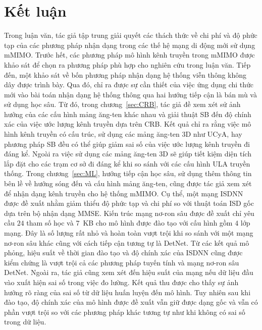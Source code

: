 \clearpage
{}

\chapter*{Kết luận}

Trong luận văn, tác giả tập trung giải quyết các thách thức về chi phí và độ phức tạp của các phương pháp nhận dạng trong các thế hệ mạng di động mới sử dụng mMIMO. Trước hết, các phương pháp mô hình kênh truyền trong mMIMO được khảo sát để chọn ra phương pháp phù hợp cho nghiên cứu trong luận văn. Tiếp đến,
một khảo sát về bốn phương pháp nhận dạng hệ thống viễn thông không dây được trình bày. Qua đó, chỉ ra được sự cần thiết của việc ứng dụng chi thức mới vào bài toán nhận dạng hệ thống thông qua hai hướng tiếp cận là bán mù và sử dụng học sâu. 
Từ đó, trong chương~\ref{sec:CRB}, tác giả đề xem xét sử ảnh hưởng của các cấu hình mảng ăng-ten khác nhau và giải thuật SB đến độ chính xác của việc ước lượng kênh truyền dựa trên CRB. Kết quả chỉ ra rằng việc mô hình kênh truyền có cấu trúc, sử dụng các mảng ăng-ten 3D như UCyA, hay phương pháp SB đều có thể giúp giảm sai số của việc ước lượng kênh truyền đi đáng kể. Ngoài ra việc sử dụng các mảng ăng-ten 3D sẽ giúp tiết kiệm diện tích lắp đặt cho các trạm cơ sở đi đáng kể khi so sánh với các cấu hình ULA truyền thống.
Trong chương~\ref{sec:ML}, hướng tiếp cận học sâu, sử dụng thêm thông tin bên lề về hướng sóng đến và cấu hình mảng ăng-ten, cũng được tác giả xem xét để nhận dạng kênh truyền cho hệ thống mMIMO. Cụ thể, một mạng ISDNN được đề xuất nhằm giảm thiểu độ phức tạp và chi phí so với thuật toán ISD gốc dựa trên bộ nhận dạng MMSE. Kiến trúc mạng nơ-ron sâu được đề xuất chỉ yêu cầu $24$ tham số học và $7$~KB cho mô hình được đào tạo với cấu hình gồm $4$ lớp mạng. Đây là số lượng rất nhỏ và hoàn toàn vượt trội khi so sánh với một mạng nơ-ron sâu khác cũng với cách tiếp cận tương tự là DetNet. Từ các kết quả mô phỏng, hiệu suất về thời gian đào tạo và độ chính xác của ISDNN cũng được kiểm chứng là vượt trội cả các phương pháp tuyến tính và mạng nơ-ron sâu DetNet.
Ngoài ra, tác giả cũng xem xét đến hiệu suất của mạng nếu dữ liệu đầu vào xuất hiện sai số trong việc đo lường. Kết quả thu được cho thấy sự ảnh hưởng rõ ràng của sai số từ dữ liệu huấn luyện đến mô hình. Tuy nhiên sau khi đào tạo, độ chính xác của mô hình được đề xuất vẫn giữ được dạng gốc và vẫn có phần vượt trội so với các phương pháp khác tương tự như khi không có sai số trong dữ liệu. 

